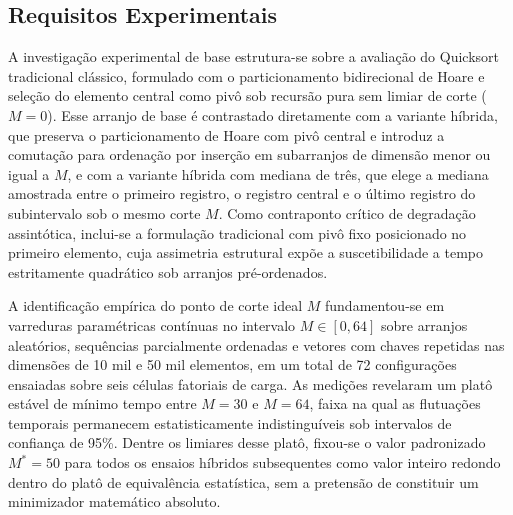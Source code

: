 \documentclass[12pt]{article}
\begin{document}
\begin{table}[htbp]
\centering
\caption{Caracterização do ambiente de medição e topologia do processador.}
\label{tab:host-info}
\end{table}

\subsection{Requisitos Experimentais}\label{sec:met-requisitos}

A investigação experimental de base estrutura-se sobre a avaliação do Quicksort tradicional clássico, formulado com o particionamento bidirecional de Hoare e seleção do elemento central como pivô sob recursão pura sem limiar de corte ($M = 0$). Esse arranjo de base é contrastado diretamente com a variante híbrida, que preserva o particionamento de Hoare com pivô central e introduz a comutação para ordenação por inserção em subarranjos de dimensão menor ou igual a $M$, e com a variante híbrida com mediana de três, que elege a mediana amostrada entre o primeiro registro, o registro central e o último registro do subintervalo sob o mesmo corte $M$. Como contraponto crítico de degradação assintótica, inclui-se a formulação tradicional com pivô fixo posicionado no primeiro elemento, cuja assimetria estrutural expõe a suscetibilidade a tempo estritamente quadrático sob arranjos pré-ordenados.

A identificação empírica do ponto de corte ideal $M$ fundamentou-se em varreduras paramétricas contínuas no intervalo $M \in [0, 64]$ sobre arranjos aleatórios, sequências parcialmente ordenadas e vetores com chaves repetidas nas dimensões de 10 mil e 50 mil elementos, em um total de 72 configurações ensaiadas sobre seis células fatoriais de carga. As medições revelaram um platô estável de mínimo tempo entre $M = 30$ e $M = 64$, faixa na qual as flutuações temporais permanecem estatisticamente indistinguíveis sob intervalos de confiança de 95\%. Dentre os limiares desse platô, fixou-se o valor padronizado $M^* = 50$ para todos os ensaios híbridos subsequentes como valor inteiro redondo dentro do platô de equivalência estatística, sem a pretensão de constituir um minimizador matemático absoluto.
\end{document}

